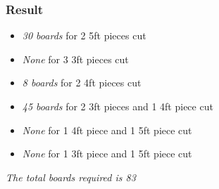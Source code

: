 \documentclass[]{article}
\providecommand{\tightlist}{%
  \setlength{\itemsep}{0pt}\setlength{\parskip}{0pt}}
\begin{document}
\subsubsection{Result}\label{result-1}

\begin{itemize}
\tightlist
\item
  \emph{30 boards} for 2 5ft pieces cut
\item
  \emph{None} for 3 3ft pieces cut
\item
  \emph{8 boards} for 2 4ft pieces cut
\item
  \emph{45 boards} for 2 3ft pieces and 1 4ft piece cut
\item
  \emph{None} for 1 4ft piece and 1 5ft piece cut
\item
  \emph{None} for 1 3ft piece and 1 5ft piece cut
\end{itemize}

\emph{The total boards required is 83}
\end{document}
